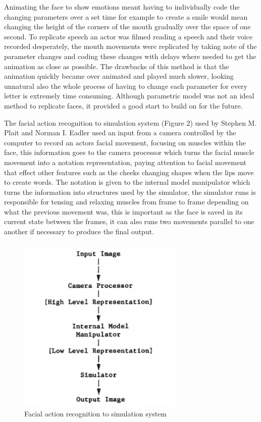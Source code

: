 \documentclass{scrartcl}
\begin{document}
Animating the face to show emotions meant having to individually code the changing parameters over a set time for example to create a smile would mean changing the height of the corners of the mouth gradually over the space of one second. To replicate speech an actor was filmed reading a speech and their voice recorded desperately, the mouth movements were replicated by taking note of the parameter changes and coding these changes with delays where needed to get the animation as close as possible. The drawbacks of this method is that the animation quickly became over animated and played much slower, looking unnatural also the whole process of having to change each parameter for every letter is extremely time consuming. Although parametric model was not an ideal method to replicate faces, it provided a good start to build on for the future\cite{parke1974parametric}.

The facial action recognition to simulation system (Figure 2) used by Stephen M. Plait and Norman I. Eadler used an input from a camera controlled by the computer to record an actors facial movement, focusing on muscles within the face, this information goes to the camera processor which turns the facial muscle movement into a notation representation, paying attention to facial movement that effect other features such as the cheeks changing shapes when the lips move to create words. The notation is given to the internal model manipulator which turns the information into structures used by the simulator, the simulator runs is responsible for tensing and relaxing muscles from frame to frame depending on what the previous movement was, this is important as the face is saved in its current state between the frames, it can also runs two movements parallel to one another if necessary to produce the final output\cite{platt1981animating}.

\begin{figure}[h]
\includegraphics[width=8cm]{Facial_action_recognition_to_simulation_system.png}
\caption{Facial action recognition to simulation system \cite{platt1981animating}}
\label{fig:Model2}
\end{figure}
\end{document}
